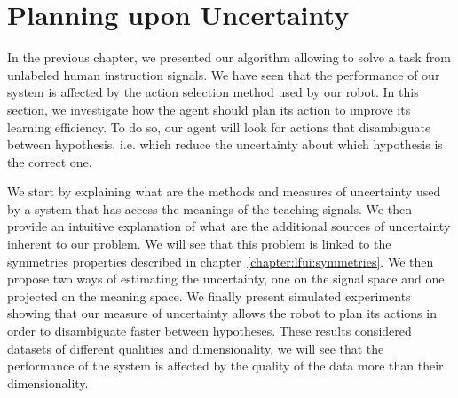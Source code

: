 
\chapter{Planning upon Uncertainty}
\label{chapter:planning}
\minitoc


In the previous chapter, we presented our algorithm allowing to solve a task from unlabeled human instruction signals. We have seen that the performance of our system is affected by the action selection method used by our robot. In this section, we investigate how the agent should plan its action to improve its learning efficiency. To do so, our agent will look for actions that disambiguate between hypothesis, i.e. which reduce the uncertainty about which hypothesis is the correct one.

We start by explaining what are the methods and measures of uncertainty used by a system that has access the meanings of the teaching signals. We then provide an intuitive explanation of what are the additional sources of uncertainty inherent to our problem. We will see that this problem is linked to the symmetries properties described in chapter~\ref{chapter:lfui:symmetries}. We then propose two ways of estimating the uncertainty, one on the signal space and one projected on the meaning space. We finally present simulated experiments showing that our measure of uncertainty allows the robot to plan its actions in order to disambiguate faster between hypotheses. These results considered datasets of different qualities and dimensionality, we will see that the performance of the system is affected by the quality of the data more than their dimensionality. 


